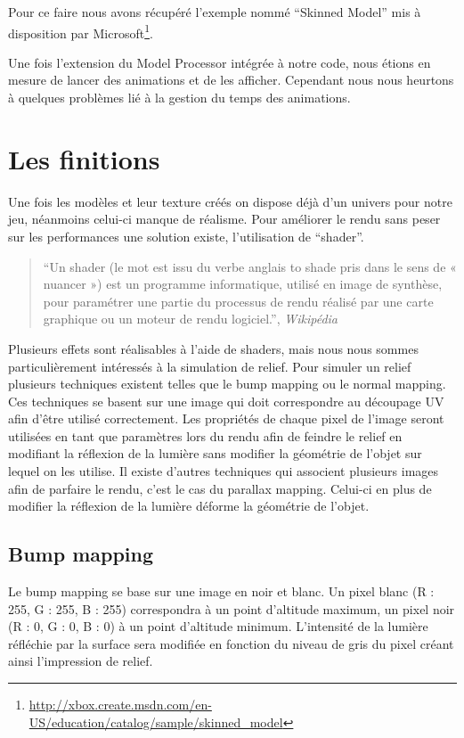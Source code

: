 \documentclass[11pt]{report}
\begin{document}
Pour ce faire nous avons récupéré l'exemple nommé ``Skinned Model'' mis à disposition par Microsoft\footnote{\url{http://xbox.create.msdn.com/en-US/education/catalog/sample/skinned_model}}.

Une fois l’extension du Model Processor intégrée à notre code, nous étions en mesure de lancer des animations et de les afficher. Cependant nous nous heurtons à quelques problèmes lié à la gestion du temps des animations.

\section{Les finitions}

Une fois les modèles et leur texture créés on dispose déjà d’un univers pour notre jeu, néanmoins celui-ci manque de réalisme. Pour améliorer le rendu sans peser sur les performances une solution existe, l’utilisation de ``shader''.

\begin{quote}
``Un shader (le mot est issu du verbe anglais to shade pris dans le sens de « nuancer ») est un programme informatique, utilisé en image de synthèse, pour paramétrer une partie du processus de rendu réalisé par une carte graphique ou un moteur de rendu logiciel.'', \emph{Wikipédia}
\end{quote}

Plusieurs effets sont réalisables à l’aide de shaders, mais nous nous sommes particulièrement intéressés à la simulation de relief. Pour simuler un relief plusieurs techniques existent telles que le bump mapping ou le normal mapping. Ces techniques se basent sur une image qui doit correspondre au découpage UV afin d’être utilisé correctement. Les propriétés de chaque pixel de l’image seront utilisées en tant que paramètres lors du rendu afin de feindre le relief en modifiant la réflexion de la lumière sans modifier la géométrie de l’objet sur lequel on les utilise. Il existe d’autres techniques qui associent plusieurs images afin de parfaire le rendu, c’est le cas du parallax mapping. Celui-ci en plus de modifier la réflexion de la lumière déforme la géométrie de l’objet.

\subsection{Bump mapping}

Le bump mapping se base sur une image en noir et blanc. Un pixel blanc (R : 255, G : 255, B : 255) correspondra à un point d'altitude maximum, un pixel noir (R : 0, G : 0, B : 0) à un point d’altitude minimum. L'intensité de la lumière réfléchie par la surface sera modifiée en fonction du niveau de gris du pixel créant ainsi l'impression de relief.
\end{document}

